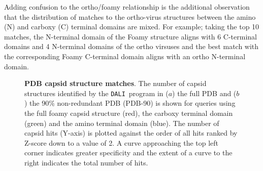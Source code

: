\documentclass[preprint,12pt]{elsarticle}
\newcommand{\DALI}{{\tt DALI}}
\begin{document}
Adding confusion to the ortho/foamy relationship is the additional observation that
the distribution of matches to the ortho-virus structures between the amino (N) and carboxy
(C) terminal domains are mixed.   For example; taking the top 10 matches, the N-terminal domain of the Foamy
structure aligns with 6 C-terminal domains and 4 N-terminal domains of the ortho virsuses
and the best match with the corresponding Foamy C-terminal domain aligns with an ortho N-terminal domain.

\begin{figure}
\centering
{}
\begin{footnotesize}
\caption{
\label{Fig:rocs}
{\bf PDB capsid structure matches}.
The number of capsid structures identified by the \DALI\ program in ($a$) the full PDB and ($b$)
the 90\% non-redundant PDB (PDB-90) is shown for queries using the full foamy capsid
structure (red), the carboxy terminal domain (green) and the amino terminal domain (blue).
The number of capsid hits (Y-axis) is plotted against the order of all hits ranked by Z-score
down to a value of 2.   A curve approaching the top left corner indicates greater specificity
and the extent of a curve to the right indicates the total number of hits.
}
\end{footnotesize}
\end{figure}
\end{document}
